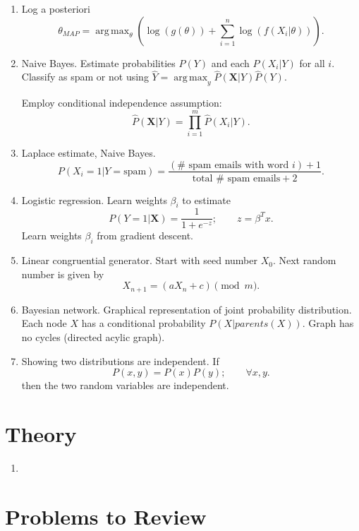 \documentclass{article}
\DeclareMathOperator*{\argmax}{arg\,max}
\begin{document}
\begin{enumerate}
  \item Log a posteriori
    \[
      \theta_{MAP} = \argmax_{\theta}\left(  \log (g(\theta)) + \sum_{i=1}^{n} \log (f(X_i | \theta)) \right).
    \]


  \item Naive Bayes.  Estimate probabilities $P(Y)$ and each $P(X_i | Y)$ for all $i$.  Classify as spam or not using $\hat{Y} = \argmax_{y} \hat{P} (\mathbf{X} | Y) \hat{P}(Y)$.

    Employ conditional independence assumption:
    \[
      \hat{P}(\mathbf{X} | Y) = \prod_{i=1}^{m} \hat{P}(X_i | Y).
    \]

  \item Laplace estimate, Naive Bayes.
    \[
      P(X_i = 1 | Y = \text{spam}) = \frac{(\text{# spam emails with word } i) + 1}{\text{total # spam emails} + 2}.
    \]

  \item Logistic regression.  Learn weights $\beta_i$ to estimate 
    \[
      P(Y = 1 | \mathbf{X}) = \frac{1}{1 + e^{-z}}; \qquad z = \beta^T x.
    \]
    Learn weights $\beta_i$ from gradient descent.
  
  \item Linear congruential generator.  Start with seed number $X_0$.  Next random number is given by 
    \[
      X_{n+1} = (a X_n + c) \pmod{m}.
    \]

  \item Bayesian network.  Graphical representation of joint probability distribution.  Each node $X$ has a conditional probability $P(X | parents(X))$.  Graph has no cycles (directed acylic graph).

  \item Showing two distributions are independent.  If
    \[
      P(x, y) = P(x) P(y); \qquad \forall x,y.
    \]
    then the two random variables are independent.
  \end{enumerate}

\section{Theory}

\begin{enumerate}
  \item 
\end{enumerate}

\section{Problems to Review}
\end{document}
